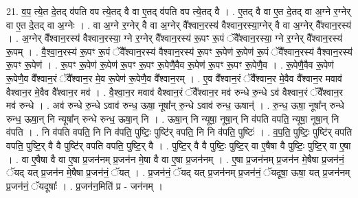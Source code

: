 \documentclass[17pt]{extarticle}
\begin{document}
21. व॒प॒ त्ये॒त दे॒तद् व॑पति वप त्ये॒तद् वै वा ए॒तद् व॑पति वप त्ये॒तद् वै । . ए॒तद् वै वा ए॒त दे॒तद् वा अ॒ग्ने र॒ग्नेर् वा ए॒त दे॒तद् वा अ॒ग्नेः । . वा अ॒ग्ने र॒ग्नेर् वै वा अ॒ग्नेर् वै᳚श्वान॒रस्य॑ वैश्वान॒रस्या॒ग्नेर् वै वा अ॒ग्नेर् वै᳚श्वान॒रस्य॑ । . अ॒ग्नेर् वै᳚श्वान॒रस्य॑ वैश्वान॒रस्या॒ ग्ने र॒ग्नेर् वै᳚श्वान॒रस्य॑ रू॒पꣳ रू॒पं ॅवै᳚श्वान॒रस्या॒ ग्ने र॒ग्नेर् वै᳚श्वान॒रस्य॑ रू॒पम् । . वै॒श्वा॒न॒रस्य॑ रू॒पꣳ रू॒पं ॅवै᳚श्वान॒रस्य॑ वैश्वान॒रस्य॑ रू॒पꣳ रू॒पेण॑ रू॒पेण॑ रू॒पं ॅवै᳚श्वान॒रस्य॑ वैश्वान॒रस्य॑ रू॒पꣳ रू॒पेण॑ । . रू॒पꣳ रू॒पेण॑ रू॒पेण॑ रू॒पꣳ रू॒पꣳ रू॒पेणै॒वैव रू॒पेण॑ रू॒पꣳ रू॒पꣳ रू॒पेणै॒व । . रू॒पेणै॒वैव रू॒पेण॑ रू॒पेणै॒व वै᳚श्वान॒रं ॅवै᳚श्वान॒र मे॒व रू॒पेण॑ रू॒पेणै॒व वै᳚श्वान॒रम् । . ए॒व वै᳚श्वान॒रं ॅवै᳚श्वान॒र मे॒वैव वै᳚श्वान॒र मवाव॑ वैश्वान॒र मे॒वैव वै᳚श्वान॒र मव॑ । . वै॒श्वा॒न॒र मवाव॑ वैश्वान॒रं ॅवै᳚श्वान॒र मव॑ रुन्धे रु॒न्धे ऽव॑ वैश्वान॒रं ॅवै᳚श्वान॒र मव॑ रुन्धे । . अव॑ रुन्धे रु॒न्धे ऽवाव॑ रुन्ध॒ ऊषा॒ नूषा᳚न् रु॒न्धे ऽवाव॑ रुन्ध॒ ऊषान्॑ । . रु॒न्ध॒ ऊषा॒ नूषा᳚न् रुन्धे रुन्ध॒ ऊषा॒न् नि न्यूषा᳚न् रुन्धे रुन्ध॒ ऊषा॒न् नि । . ऊषा॒न् नि न्यूषा॒ नूषा॒न् नि व॑पति वपति॒ न्यूषा॒ नूषा॒न् नि व॑पति । . नि व॑पति वपति॒ नि नि व॑पति॒ पुष्टिः॒ पुष्टि॑र् वपति॒ नि नि व॑पति॒ पुष्टिः॑ । . व॒प॒ति॒ पुष्टिः॒ पुष्टि॑र् वपति वपति॒ पुष्टि॒र् वै वै पुष्टि॑र् वपति वपति॒ पुष्टि॒र् वै । . पुष्टि॒र् वै वै पुष्टिः॒ पुष्टि॒र् वा ए॒षैषा वै पुष्टिः॒ पुष्टि॒र् वा ए॒षा । . वा ए॒षैषा वै वा ए॒षा प्र॒जन॑नम् प्र॒जन॑न मे॒षा वै वा ए॒षा प्र॒जन॑नम् । . ए॒षा प्र॒जन॑नम् प्र॒जन॑न मे॒षैषा प्र॒जन॑नं॒ ॅयद् यत् प्र॒जन॑न मे॒षैषा प्र॒जन॑नं॒ ॅयत् । . प्र॒जन॑नं॒ ॅयद् यत् प्र॒जन॑नम् प्र॒जन॑नं॒ ॅयदूषा॒ ऊषा॒ यत् प्र॒जन॑नम् प्र॒जन॑नं॒ ॅयदूषाः᳚ । . प्र॒जन॑न॒मिति॑ प्र - जन॑नम् । \newline
\end{document}
